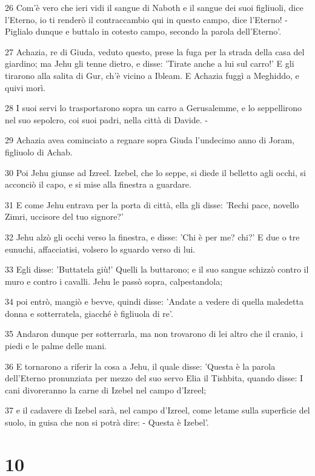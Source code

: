 \par 26 Com'è vero che ieri vidi il sangue di Naboth e il sangue dei suoi figliuoli, dice l'Eterno, io ti renderò il contraccambio qui in questo campo, dice l'Eterno! - Piglialo dunque e buttalo in cotesto campo, secondo la parola dell'Eterno'.
\par 27 Achazia, re di Giuda, veduto questo, prese la fuga per la strada della casa del giardino; ma Jehu gli tenne dietro, e disse: 'Tirate anche a lui sul carro!' E gli tirarono alla salita di Gur, ch'è vicino a Ibleam. E Achazia fuggì a Meghiddo, e quivi morì.
\par 28 I suoi servi lo trasportarono sopra un carro a Gerusalemme, e lo seppellirono nel suo sepolcro, coi suoi padri, nella città di Davide. -
\par 29 Achazia avea cominciato a regnare sopra Giuda l'undecimo anno di Joram, figliuolo di Achab.
\par 30 Poi Jehu giunse ad Izreel. Izebel, che lo seppe, si diede il belletto agli occhi, si acconciò il capo, e si mise alla finestra a guardare.
\par 31 E come Jehu entrava per la porta di città, ella gli disse: 'Rechi pace, novello Zimri, uccisore del tuo signore?'
\par 32 Jehu alzò gli occhi verso la finestra, e disse: 'Chi è per me? chi?' E due o tre eunuchi, affacciatisi, volsero lo sguardo verso di lui.
\par 33 Egli disse: 'Buttatela giù!' Quelli la buttarono; e il suo sangue schizzò contro il muro e contro i cavalli. Jehu le passò sopra, calpestandola;
\par 34 poi entrò, mangiò e bevve, quindi disse: 'Andate a vedere di quella maledetta donna e sotterratela, giacché è figliuola di re'.
\par 35 Andaron dunque per sotterrarla, ma non trovarono di lei altro che il cranio, i piedi e le palme delle mani.
\par 36 E tornarono a riferir la cosa a Jehu, il quale disse: 'Questa è la parola dell'Eterno pronunziata per mezzo del suo servo Elia il Tishbita, quando disse: I cani divoreranno la carne di Izebel nel campo d'Izreel;
\par 37 e il cadavere di Izebel sarà, nel campo d'Izreel, come letame sulla superficie del suolo, in guisa che non si potrà dire: - Questa è Izebel'.

\chapter{10}

